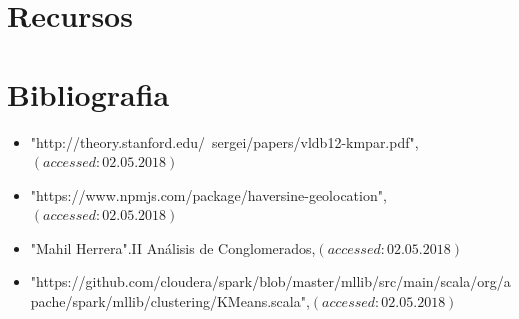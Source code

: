 \documentclass[a4paper]{article}
\begin{document}
\section{Recursos}

\section{Bibliografia}
\begin{itemize}
	\item "http://theory.stanford.edu/~sergei/papers/vldb12-kmpar.pdf",$(accessed: 02.05.2018)$
	\item "https://www.npmjs.com/package/haversine-geolocation",$(accessed: 02.05.2018)$
	\item "Mahil Herrera".II An\'alisis de Conglomerados,$(accessed: 02.05.2018)$
    \item "https://github.com/cloudera/spark/blob/master/mllib/src/main/scala/org/apache/spark/mllib/clustering/KMeans.scala",$(accessed: 02.05.2018)$
\end{itemize}
\end{document}
